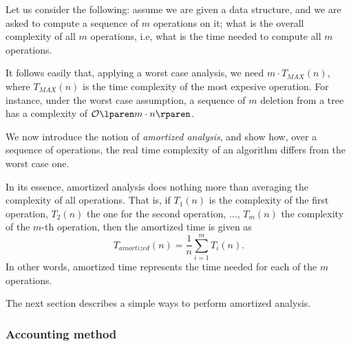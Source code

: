 \documentclass{subfiles}
\begin{document}
    Let us consider the following: assume we are given a data structure,
        and we are asked to compute a sequence of \(m\) operations on it;
        what is the overall complexity of all \(m\) operations, i.e,
        what is the time needed to compute all \(m\) operations.

    It follows easily that, applying a worst case analysis,
        we need \(m \cdot T_{MAX}(n)\), where \(T_{MAX}(n)\) 
        is the time complexity of the most expesive operation.
        For instance, under the worst case assumption,
        a sequence of \(m\) deletion from a tree has a complexity of \(\ofO{m \cdot n}\).

    We now introduce the notion of \emph{amortized analysis},
        and show how, over a sequence of operations, 
        the real time complexity of an algorithm differs from the worst case one.

    In its essence, amortized analysis does nothing more than averaging the complexity of 
        all operations. That is, if \(T_{1}(n)\) is the complexity of the first operation,
        \(T_{2}(n)\) the one for the second operation, \(\ldots\), 
        \(T_{m}(n)\) the complexity of the \(m\)-th operation, 
        then the amortized time is given as 
        \[
            T_{amortized}(n) = \frac{1}{n} \sum_{i = 1}^{m} T_{i}(n).
        \]
        In other words, amortized time represents the time needed for each of 
        the \(m\) operations.

    The next section describes a simple ways to perform amortized analysis.
    \subsubsection{Accounting method}
    
\end{document}
